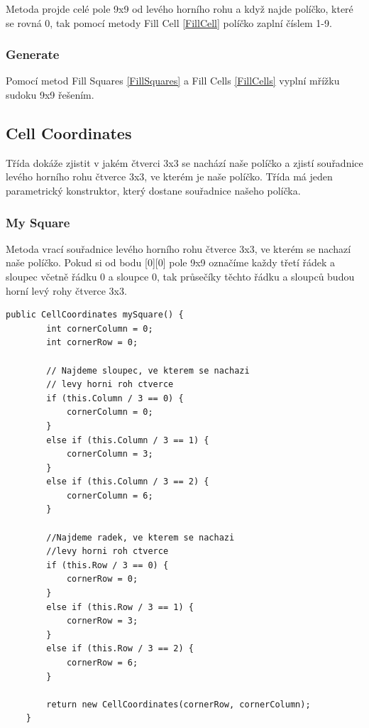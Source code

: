Metoda projde celé pole 9x9 od levého horního rohu a když najde políčko, které se rovná 0, tak pomocí metody Fill Cell \ref{FillCell} políčko zaplní číslem 1-9.

\subsubsection{Generate}
Pomocí metod Fill Squares \ref{FillSquares} a Fill Cells \ref{FillCells} vyplní mřížku sudoku 9x9 řešením.

\label{CellCoordinates}\subsection{Cell Coordinates}
Třída dokáže zjistit v jakém čtverci 3x3 se nachází naše políčko a zjistí souřadnice levého horního rohu čtverce 3x3, ve kterém je naše políčko. Třída má jeden parametrický konstruktor, který dostane souřadnice našeho políčka.

\subsubsection{My Square}
Metoda vrací souřadnice levého horního rohu čtverce 3x3, ve kterém se nachazí naše políčko. Pokud si od bodu [0][0] pole 9x9 označíme každy třetí řádek a sloupec včetně řádku 0 a sloupce 0, tak průsečíky těchto řádku a sloupců budou horní levý rohy čtverce 3x3. 

\begin{small}
\begin{lstlisting}
public CellCoordinates mySquare() {
        int cornerColumn = 0;
        int cornerRow = 0;

        // Najdeme sloupec, ve kterem se nachazi
        // levy horni roh ctverce
        if (this.Column / 3 == 0) {
            cornerColumn = 0;
        }
        else if (this.Column / 3 == 1) {
            cornerColumn = 3;
        }
        else if (this.Column / 3 == 2) {
            cornerColumn = 6;
        }

        //Najdeme radek, ve kterem se nachazi
        //levy horni roh ctverce
        if (this.Row / 3 == 0) {
            cornerRow = 0;
        }
        else if (this.Row / 3 == 1) {
            cornerRow = 3;
        }
        else if (this.Row / 3 == 2) {
            cornerRow = 6;
        }

        return new CellCoordinates(cornerRow, cornerColumn);
    }
\end{lstlisting}
\end{small}

